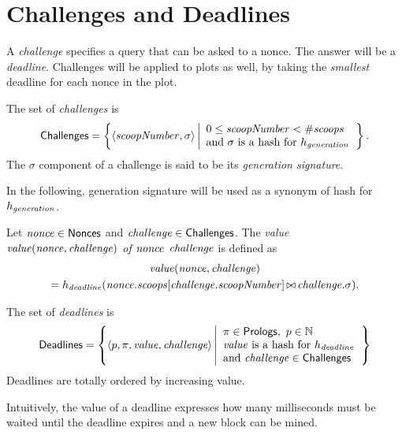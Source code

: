 \section{Challenges and Deadlines}\label{sec:challenges_and_deadlines}

A \emph{challenge} specifies a query that can be asked to a nonce.
The answer will be a \emph{deadline}.
Challenges will be applied to plots as well, by taking
the \emph{smallest} deadline for each nonce in the plot.
%
\begin{definition}[Challenge]\label{def:challenge}
  The set of \emph{challenges} is
  \[
  {\mathsf{Challenges}}=\left\{\langle{\mathit{scoopNumber}},\sigma\rangle\left|
  \begin{array}{l}
    0\le{\mathit{scoopNumber}}<{\#\mathit{scoops}}\\
    \text{and $\sigma$ is a hash for $h_{\mathit{generation}}$}
  \end{array}
  \right.\right\}.
  \]
  The $\sigma$ component of a challenge is said to be its \emph{generation signature}.
\end{definition}
%
In the following, generation signature will be used as a synonym of hash for $h_{\mathit{generation}}$.
%
\begin{definition}\label{def:nonce_value}
  Let ${\mathit{nonce}}\in{\mathsf{Nonces}}$ and ${\mathit{challenge}}\in{\mathsf{Challenges}}$.
  The \emph{value $\mathit{value}({\mathit{nonce}},{\mathit{challenge}})$ of ${\mathit{nonce}}$ \wrt ${\mathit{challenge}}$} is defined as
  \begin{multline*}
    \mathit{value}({\mathit{nonce}},{\mathit{challenge}})\\
    =h_{\mathit{deadline}}({\mathit{nonce}}.{\mathit{scoops}}[{\mathit{challenge}}.{\mathit{scoopNumber}}]\operatorname*{\bowtie}{\mathit{challenge}}.\sigma).
  \end{multline*}
\end{definition}
%
\begin{definition}[Deadline]\label{def:deadline}
  The set of \emph{deadlines} is
  \[
  {\mathsf{Deadlines}}=\left\{
  \langle p,\pi,\mathit{value},{\mathit{challenge}}\rangle
  \left|\begin{array}{l}
  \pi\in{\mathsf{Prologs}},\ p\in\mathbb{N}\\
  \mathit{value}\text{ is a hash for }h_{\mathit{deadline}}\\
  \text{and }{\mathit{challenge}}\in{\mathsf{Challenges}}
  \end{array}
  \right.
  \right\}
  \]
  Deadlines are totally ordered by increasing value.
\end{definition}
%
Intuitively, the value of a deadline expresses how many milliseconds
must be waited until the deadline expires and a new block can be mined.
